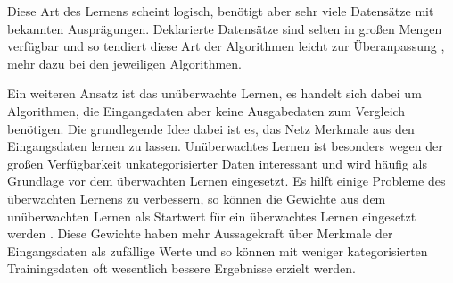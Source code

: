 Diese Art des Lernens scheint logisch, benötigt aber sehr viele Datensätze mit bekannten Ausprägungen. Deklarierte Datensätze sind selten in großen Mengen verfügbar und so tendiert diese Art der Algorithmen leicht zur Überanpassung \citep{overfitting}, mehr dazu bei den jeweiligen Algorithmen.

Ein weiteren Ansatz ist das unüberwachte Lernen, es handelt sich dabei um Algorithmen, die Eingangsdaten aber keine Ausgabedaten zum Vergleich benötigen. Die grundlegende Idee dabei ist es, das Netz Merkmale aus den Eingangsdaten lernen zu lassen. Unüberwachtes Lernen ist besonders wegen der großen Verfügbarkeit unkategorisierter Daten interessant und wird häufig als Grundlage vor dem überwachten Lernen eingesetzt. Es hilft einige Probleme des überwachten Lernens zu verbessern, so können die Gewichte aus dem unüberwachten Lernen als Startwert für ein überwachtes Lernen eingesetzt werden \citep{preunsupervised}. Diese Gewichte haben mehr Aussagekraft über Merkmale der Eingangsdaten als zufällige Werte und so können mit weniger kategorisierten Trainingsdaten oft wesentlich bessere Ergebnisse erzielt werden.